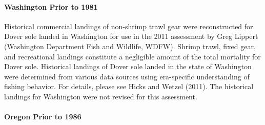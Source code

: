 \documentclass[11pt,
  english,
  a4paper,
]{article}
\begin{document}
\leavevmode\tagmcend\tagstructend\par


\hypertarget{washington-prior-to-1981}{%
\paragraph{Washington Prior to 1981}\label{washington-prior-to-1981}}

\leavevmode\tagmcend\tagstructend


Historical commercial landings of non-shrimp trawl gear were reconstructed for Dover sole landed in Washington for use in the 2011 assessment by Greg Lippert (Washington Department Fish and Wildlife, WDFW). Shrimp trawl, fixed gear, and recreational landings constitute a negligible amount of the total mortality for Dover sole. Historical landings of Dover sole landed in the state of Washington were determined from various data sources using era-specific understanding of fishing behavior. For details, please see Hicks and Wetzel {(2011)\leavevmode\tagmcend\tagstructend}. The historical landings for Washington were not revised for this assessment.

\leavevmode\tagmcend\tagstructend\par


\hypertarget{oregon-prior-to-1986}{%
\paragraph{Oregon Prior to 1986}\label{oregon-prior-to-1986}}

\leavevmode\tagmcend\tagstructend

\end{document}

